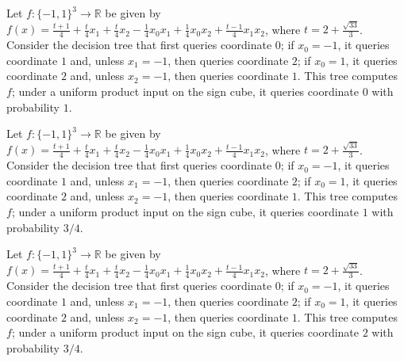 \begin{theorem}
\label{FABL.osssCounterexample_queryProbability_zero}
\leanok
{}
Let $f:\{-1,1\}^3\to\mathbb R$ be given by
$f(x)=\frac{t+1}{4}+\frac{t}{4}x_1+\frac{t}{4}x_2-\frac14x_0x_1+\frac14x_0x_2+\frac{t-1}{4}x_1x_2$,
where $t=2+\frac{\sqrt{33}}{3}$. Consider the decision tree that first queries
coordinate $0$; if $x_0=-1$, it queries coordinate $1$ and, unless $x_1=-1$, then
queries coordinate $2$; if $x_0=1$, it queries coordinate $2$ and, unless $x_2=-1$, then
queries coordinate $1$. This tree computes $f$; under a uniform product input on the
sign cube, it queries coordinate $0$ with probability $1$.
\end{theorem}

\begin{theorem}
\label{FABL.osssCounterexample_queryProbability_one}
\leanok
{}
Let $f:\{-1,1\}^3\to\mathbb R$ be given by
$f(x)=\frac{t+1}{4}+\frac{t}{4}x_1+\frac{t}{4}x_2-\frac14x_0x_1+\frac14x_0x_2+\frac{t-1}{4}x_1x_2$,
where $t=2+\frac{\sqrt{33}}{3}$. Consider the decision tree that first queries
coordinate $0$; if $x_0=-1$, it queries coordinate $1$ and, unless $x_1=-1$, then
queries coordinate $2$; if $x_0=1$, it queries coordinate $2$ and, unless $x_2=-1$, then
queries coordinate $1$. This tree computes $f$; under a uniform product input on the
sign cube, it queries coordinate $1$ with probability $3/4$.
\end{theorem}

\begin{theorem}
\label{FABL.osssCounterexample_queryProbability_two}
\leanok
{}
Let $f:\{-1,1\}^3\to\mathbb R$ be given by
$f(x)=\frac{t+1}{4}+\frac{t}{4}x_1+\frac{t}{4}x_2-\frac14x_0x_1+\frac14x_0x_2+\frac{t-1}{4}x_1x_2$,
where $t=2+\frac{\sqrt{33}}{3}$. Consider the decision tree that first queries
coordinate $0$; if $x_0=-1$, it queries coordinate $1$ and, unless $x_1=-1$, then
queries coordinate $2$; if $x_0=1$, it queries coordinate $2$ and, unless $x_2=-1$, then
queries coordinate $1$. This tree computes $f$; under a uniform product input on the
sign cube, it queries coordinate $2$ with probability $3/4$.
\end{theorem}


